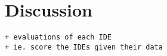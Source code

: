 \section{Discussion}
\label{sec:discussion}

\begin{verbatim}
+ evaluations of each IDE
+ ie. score the IDEs given their data
\end{verbatim}
